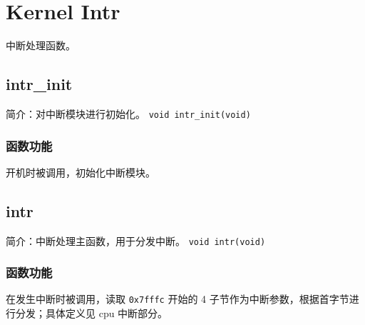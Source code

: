 %
%
%
%
%
%
%
%

\chapter{Kernel Intr}
中断处理函数。

\section{intr\_init}
简介：对中断模块进行初始化。
\texttt{void intr\_init(void)}

\subsection{函数功能}

开机时被调用，初始化中断模块。

\section{intr}
简介：中断处理主函数，用于分发中断。
\texttt{void intr(void)}

\subsection{函数功能}

在发生中断时被调用，读取 \texttt{0x7fffc} 开始的 4 子节作为中断参数，根据首字节进行分发；具体定义见 cpu 中断部分。